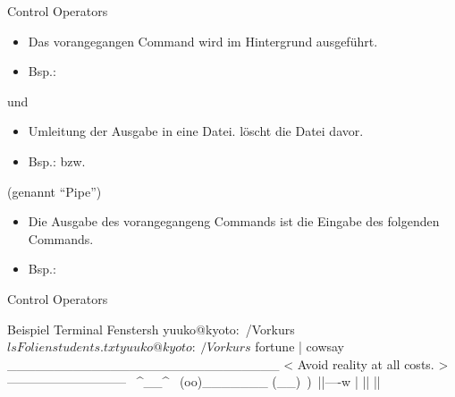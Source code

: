 \documentclass{setbeamer}
\begin{document}
\begin{frame}{Control Operators}
    \begin{itemize}
        \item Das vorangegangen Command wird im Hintergrund ausgeführt.
        \item Bsp.: 
    \end{itemize}

    \vspace{0.3cm}

     und 
    \begin{itemize}
        \item Umleitung der Ausgabe in eine Datei.  löscht die Datei davor.
        \item Bsp.:  bzw. 
    \end{itemize}

    \vspace{0.3cm}

     (genannt ``Pipe'')
    \begin{itemize}
        \item Die Ausgabe des vorangegangeng Commands ist die Eingabe des folgenden Commands.
        \item Bsp.: 
    \end{itemize}
\end{frame}

\begin{frame}[fragile]{Control Operators}
    \begin{TUMCodeBlock}{Beispiel Terminal Fenster}{sh}
        yuuko@kyoto:~/Vorkurs$ ls
        Folien  students.txt
        yuuko@kyoto:~/Vorkurs$ fortune | cowsay
         _____________________________
        < Avoid reality at all costs. >
         -----------------------------
                \   ^__^
                 \  (oo)\_______
                    (__)\       )\/\
                        ||----w |
                        ||     ||
    \end{TUMCodeBlock}
\end{frame}
\end{document}
